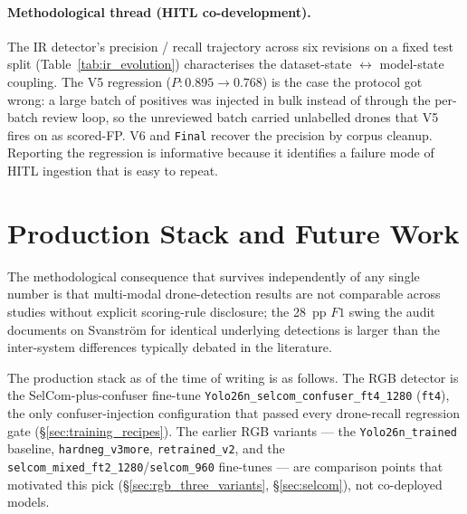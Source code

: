 \paragraph{Methodological thread (HITL co-development).}
The IR detector's precision / recall trajectory across six revisions on a fixed test split (Table~\ref{tab:ir_evolution}) characterises the dataset-state $\leftrightarrow$ model-state coupling. The V5 regression ($P: 0.895 \to 0.768$) is the case the protocol got wrong: a large batch of positives was injected in bulk instead of through the per-batch review loop, so the unreviewed batch carried unlabelled drones that V5 fires on as scored-FP. V6 and \texttt{Final} recover the precision by corpus cleanup. Reporting the regression is informative because it identifies a failure mode of HITL ingestion that is easy to repeat.

\section{Production Stack and Future Work}
\label{sec:production_stack}


The methodological consequence that survives independently of any single number is that multi-modal drone-detection results are not comparable across studies without explicit scoring-rule disclosure; the 28~pp $F1$ swing the audit documents on Svanstr\"om for identical underlying detections is larger than the inter-system differences typically debated in the literature.

The production stack as of the time of writing is as follows. The RGB detector is the SelCom-plus-confuser fine-tune \texttt{Yolo26n\_selcom\_confuser\_ft4\_1280} (\texttt{ft4}), the only confuser-injection configuration that passed every drone-recall regression gate (\S\ref{sec:training_recipes}). The earlier RGB variants --- the \texttt{Yolo26n\_trained} baseline, \texttt{hardneg\_v3more}, \texttt{retrained\_v2}, and the \texttt{selcom\_mixed\_ft2\_1280}/\texttt{selcom\_960} fine-tunes --- are comparison points that motivated this pick (\S\ref{sec:rgb_three_variants}, \S\ref{sec:selcom}), not co-deployed models.


